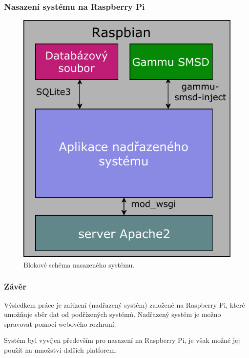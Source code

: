 \documentclass{beamer}
\begin{document}
  \begin{frame}
    \frametitle{Nasazení systému na Raspberry Pi}

    \begin{figure}
        \includegraphics[scale=0.55]{../images/sw_block.pdf}
        \caption{Blokové schéma nasazeného systému.}
      \end{figure}


  \end{frame}

  \begin{frame}
    \frametitle{Závěr}

    Výsledkem práce je zařízení (nadřazený systém) založené na Raspberry Pi, které umožňuje sběr dat od podřízených systémů. Nadřazený systém je možno spravovat pomocí webového rozhraní.

    \vspace{0.5cm}

    Systém byl vyvíjen především pro nasazení na Raspberry Pi, je však možné jej použít na množství dalších platforem. 

  \end{frame}
\end{document}
